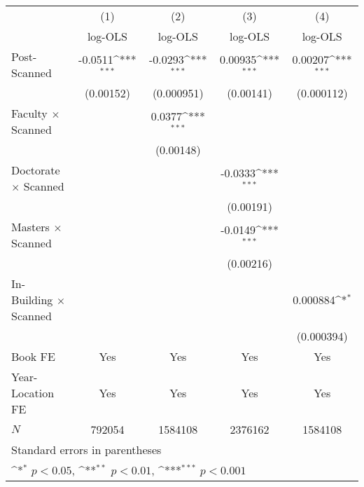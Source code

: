 {
\def\sym#1{\ifmmode^{#1}\else\(^{#1}\)\fi}
\begin{tabular}{l*{4}{c}}
\hline\hline
            &\multicolumn{1}{c}{(1)}&\multicolumn{1}{c}{(2)}&\multicolumn{1}{c}{(3)}&\multicolumn{1}{c}{(4)}\\
            &\multicolumn{1}{c}{log-OLS}&\multicolumn{1}{c}{log-OLS}&\multicolumn{1}{c}{log-OLS}&\multicolumn{1}{c}{log-OLS}\\
\hline
Post-Scanned&     -0.0511\sym{***}&     -0.0293\sym{***}&     0.00935\sym{***}&     0.00207\sym{***}\\
            &   (0.00152)         &  (0.000951)         &   (0.00141)         &  (0.000112)         \\
[1em]
Faculty $\times$ Scanned&                     &      0.0377\sym{***}&                     &                     \\
            &                     &   (0.00148)         &                     &                     \\
[1em]
Doctorate $\times$ Scanned&                     &                     &     -0.0333\sym{***}&                     \\
            &                     &                     &   (0.00191)         &                     \\
[1em]
Masters $\times$  Scanned&                     &                     &     -0.0149\sym{***}&                     \\
            &                     &                     &   (0.00216)         &                     \\
[1em]
In-Building $\times$ Scanned&                     &                     &                     &    0.000884\sym{*}  \\
            &                     &                     &                     &  (0.000394)         \\
\hline
Book FE     &         Yes         &         Yes         &         Yes         &         Yes         \\
Year-Location FE&         Yes         &         Yes         &         Yes         &         Yes         \\
\(N\)       &      792054         &     1584108         &     2376162         &     1584108         \\
\hline\hline
\multicolumn{5}{l}{\footnotesize Standard errors in parentheses}\\
\multicolumn{5}{l}{\footnotesize \sym{*} \(p<0.05\), \sym{**} \(p<0.01\), \sym{***} \(p<0.001\)}\\
\end{tabular}
}
